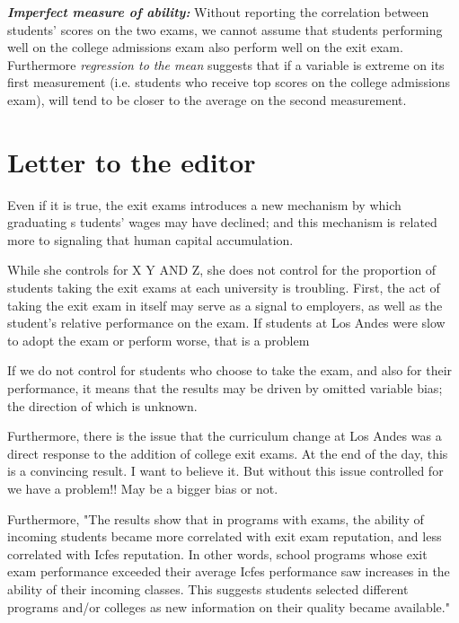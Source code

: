 \documentclass[a4paper, 11pt]{article}
\begin{document}
\noindent \textbf{\textit{Imperfect measure of ability:}} Without reporting the correlation between students' scores on the two exams, we cannot assume that students performing well on the college admissions exam also perform well on the exit exam.  Furthermore \textit{regression to the mean} suggests that if a variable is extreme on its first measurement (i.e. students who receive top scores on the college admissions exam), will tend to be closer to the average on the second measurement.  



\newpage
\section*{Letter to the editor}
Even if it is true, the exit exams introduces a new mechanism by which graduating s
tudents' wages may have declined; and this mechanism is related more to signaling that human capital accumulation. 

While she controls for X Y AND Z,  she does not control for the proportion of students taking the exit exams at each university is troubling.   First, the act of taking the exit exam in itself may serve as a signal to employers, as well as the student's relative performance on the exam.  If students at Los Andes were slow to adopt the exam or perform worse, that is a problem

If we do not control for students who choose to take the exam, and also for their performance, it means that the results may be driven by omitted variable bias; the direction of which is unknown.  



Furthermore, there is the issue that the curriculum change at Los Andes was a direct response to the addition of college exit exams.  
At the end of the day, this is a convincing result. I want to believe it.  But without this issue controlled for we have a problem!! May be a bigger bias or not. 

Furthermore, "The results show that in programs with exams, the ability of incoming students
became more correlated with exit exam reputation, and less correlated with Icfes
reputation. In other words, school programs whose exit exam performance exceeded
their average Icfes performance saw increases in the ability of their incoming classes.
This suggests students selected different programs and/or colleges as new information
on their quality became available."
\end{document}
